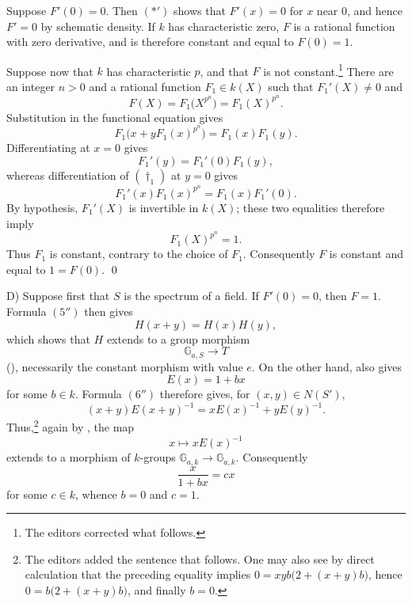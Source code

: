Suppose \(F'(0)=0\). Then \((\ast')\) shows that \(F'(x)=0\)
for \(x\) near \(0\), and hence \(F'=0\) by schematic density.
If \(k\) has characteristic zero, \(F\) is a rational function
with zero derivative, and is therefore constant and equal to
\(F(0)=1\).

Suppose now that \(k\) has characteristic \(p\), and that \(F\)
is not constant.\footnote{The editors corrected what follows.}
There are an integer \(n>0\) and a rational function
\(F_1\in k(X)\) such that \(F_1'(X)\ne0\) and
\[
  F(X)=F_1\bigl(X^{p^n}\bigr)=F_1(X)^{p^n}.
\]
Substitution in the functional equation gives
\begin{equation}\tag{\(\dagger_1\)}
  F_1\bigl(x+yF_1(x)^{p^n}\bigr)=F_1(x)F_1(y).
\end{equation}
Differentiating at \(x=0\) gives
\begin{equation}\tag{\(\ast_1\)}
  F_1'(y)=F_1'(0)F_1(y),
\end{equation}
whereas differentiation of \((\dagger_1)\) at \(y=0\) gives
\begin{equation}\tag{\(\ast'_1\)}
  F_1'(x)F_1(x)^{p^n}=F_1(x)F_1'(0).
\end{equation}
By hypothesis, \(F_1'(X)\) is invertible in \(k(X)\); these two
equalities therefore imply
\[
  F_1(X)^{p^n}=1.
\]
Thus \(F_1\) is constant, contrary to the choice of \(F_1\).
Consequently \(F\) is constant and equal to \(1=F(0)\).
\qed



\textup{D)} Suppose first that \(S\) is the spectrum of a field.
If \(F'(0)=0\), then \(F=1\). Formula \((5'')\) then gives
\[
  H(x+y)=H(x)H(y),
\]
which shows that \(H\) extends to a group morphism
\[
  \mathbb G_{a,S}\longrightarrow T
\]
\textup{()}, necessarily the constant morphism
with value \(e\). On the other hand,  also gives
\[
  E(x)=1+bx
\]
for some \(b\in k\). Formula \((6'')\) therefore gives, for
\((x,y)\in N(S')\),
\[
  (x+y)E(x+y)^{-1}=xE(x)^{-1}+yE(y)^{-1}.
\]
Thus,\footnote{The editors added the sentence that follows. One
may also see by direct calculation that the preceding equality
implies
\(0=xyb\bigl(2+(x+y)b\bigr)\), hence
\(0=b\bigl(2+(x+y)b\bigr)\), and finally \(b=0\).}
again by , the map
\[
  x\longmapsto xE(x)^{-1}
\]
extends to a morphism of \(k\)-groups
\(\mathbb G_{a,k}\to\mathbb G_{a,k}\). Consequently
\[
  \frac{x}{1+bx}=cx
\]
for some \(c\in k\), whence \(b=0\) and \(c=1\).

